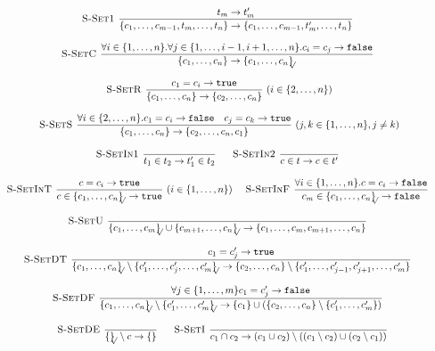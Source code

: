 \documentclass[a4paper]{article}
\newcommand{\s}[1]{\mathtt{#1}}
\newcommand{\sLb}{\s{\{}}
\newcommand{\sRb}{\s{\}}}
\newcommand{\strue}{\s{true}}
\newcommand{\sfalse}{\s{false}}
\newcommand{\sset}[1]{\sLb #1 \sRb}
\newcommand{\ssetc}[1]{\sset{#1}_{\!\!\!\surd}}
\newcommand{\step}{\to}
\newcommand{\dotset}[2]{\{#1,\ldots,#2\}}
\renewcommand{\rule}[3][]{\ \mbox{\textsc{#1 }}\dfrac{#2}{#3}\ }
\begin{document}
\[\begin{array}{c}
\rule[S-Set1]{t_m \step t'_m}{\{c_1,\ldots,c_{m-1},t_m,\ldots,t_n\} \step \{c_1,\ldots,c_{m-1},t'_m,\ldots,t_n\} }
\quad\\\\
\rule[S-SetC]{\forall i \in \dotset{1}{n}.\forall j \in \dotset{1}{i-1,i+1,\ldots,n}. c_i = c_j \step \sfalse}
{\sset{c_1,\ldots,c_n} \step \ssetc{c_1,\ldots,c_n}}
\quad\\\\
\rule[S-SetR]{c_1 = c_i \step \strue}
{\sset{c_1,\ldots,c_n} \step \sset{c_2,\ldots,c_n}}(i \in \dotset{2}{n})
\quad\\\\
\rule[S-SetS]{\forall i \in \dotset{2}{n}. c_1 = c_i \step \sfalse
\quad c_j = c_k \step \strue}
{\sset{c_1,\ldots,c_n} \step \sset{c_2,\ldots,c_n,c_1}}(j,k \in \dotset{1}{n}, j\neq k)
\quad\\\\
\rule[S-SetIn1]{}{t_1\in t_2 \step t_1'\in t_2}
\quad
\rule[S-SetIn2]{}{c\in t \step c\in t'}
\quad\\\\
\rule[S-SetInT]{c=c_i \step \strue}{c\in \ssetc{c_1,\ldots,c_n} \step \strue}(i \in \dotset{1}{n})
\quad
\rule[S-SetInF]{\forall i\in\{1,\ldots,n\}. c=c_i \step \sfalse}{c_m \in \ssetc{c_1,\ldots,c_n} \step \sfalse}
\quad\\\\
\rule[S-SetU]{}{\ssetc{c_1,\ldots,c_m} \cup \ssetc{c_{m+1},\ldots,c_n} \step
\{c_1,\ldots,c_m,c_{m+1},\ldots,c_n\}}
\quad\\\\
\rule[S-SetDT]{c_1 = c'_j \step \strue}
{\ssetc{c_1,\ldots,c_n} \setminus \ssetc{c'_1,\ldots,c'_j,\ldots,c'_m} \step
  \sset{c_2,\ldots,c_n} \setminus \sset{c'_1,\ldots,c'_{j-1},c'_{j+1},\ldots,c'_m}
}
\quad\\\\
\rule[S-SetDF]{\forall j \in \dotset{1}{m} c_1 = c'_j \step \sfalse}
{\ssetc{c_1,\ldots,c_n} \setminus \ssetc{c'_1,\ldots,c'_m} \step
  \sset{c_1} \cup (\sset{c_2,\ldots,c_n} \setminus \sset{c'_1,\ldots,c'_m})
}
\quad\\\\
\rule[S-SetDE]{}{\ssetc{} \setminus c \step \sset{}}
\quad
\rule[S-SetI]{}{c_1 \cap c_2 \step (c_1 \cup c_2) \setminus ((c_1 \setminus c_2) \cup (c_2 \setminus c_1))}
\end{array}\]
\end{document}
